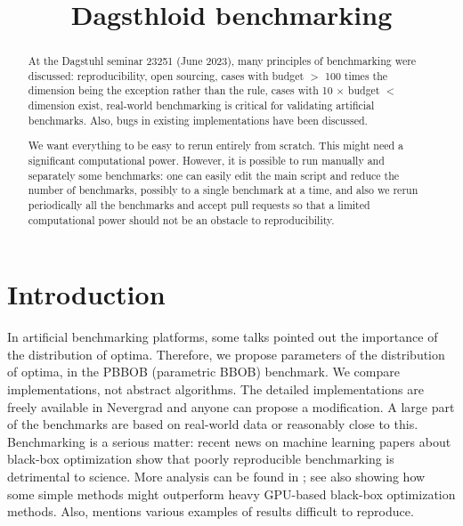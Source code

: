 \documentclass{article}
\begin{document}
\title{Dagsthloid benchmarking}

\maketitle


\begin{abstract}
At the Dagstuhl seminar 23251 (June 2023), many principles of benchmarking were discussed: reproducibility, open sourcing, cases with budget $>$ 100 times the dimension being the exception rather than the rule, cases with 10 $\times$ budget $<$ dimension exist, real-world benchmarking is critical for validating artificial benchmarks. Also, bugs in existing implementations have been discussed.

We want everything to be easy to rerun entirely from scratch. This might need a significant computational power.
However, it is possible to run manually and separately some benchmarks: one can easily edit the main script and reduce the number of benchmarks, possibly to a single benchmark at a time, and also we rerun periodically all the benchmarks and accept pull requests so that a limited computational power should not be an obstacle to reproducibility.
\end{abstract}
\tableofcontents

\section{Introduction}

In artificial benchmarking platforms, some talks pointed out the importance of the distribution of optima. Therefore, we propose parameters of the distribution of optima, in the PBBOB (parametric BBOB) benchmark.
We compare implementations, not abstract algorithms. The detailed implementations are freely available in Nevergrad and anyone can propose a modification.
A large part of the benchmarks are based on real-world data or reasonably close to this.
Benchmarking is a serious matter: recent news on machine learning papers about black-box optimization show that poorly reproducible benchmarking is detrimental to science. More analysis can be found in \cite{rlgoogle}; see also \cite{ecnassurvey,repronas,pham2018efficient,real2019regularized} showing how some simple methods might outperform heavy GPU-based black-box optimization methods. Also, \cite{leakage} mentions various examples of results difficult to reproduce.
\end{document}
